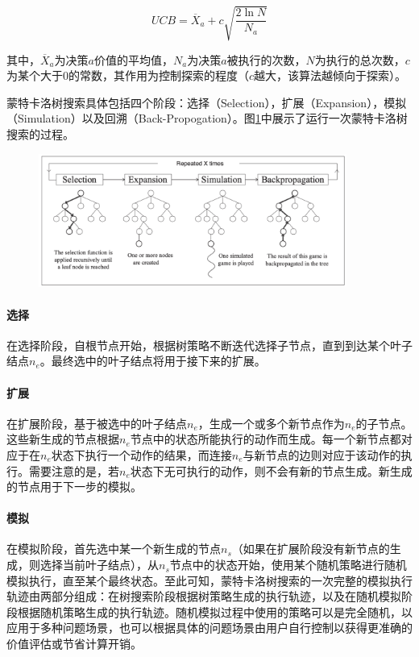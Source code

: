 \begin{equation}
UCB = \overline{X}_{a} + c\sqrt{\frac{2\ln N}{N_a}}
\end{equation}

其中，$\overline{X}_{a}$为决策$a$价值的平均值，$N_a$为决策$a$被执行的次数，$N$为执行的总次数，$c$为某个大于0的常数，其作用为控制探索的程度（$c$越大，该算法越倾向于探索）。

蒙特卡洛树搜索具体包括四个阶段：选择（Selection），扩展（Expansion），模拟（Simulation）以及回溯（Back-Propogation）。图\ref{fig:mcts_process}中展示了运行一次蒙特卡洛树搜索的过程。

\begin{figure}[htb]
\centering
\includegraphics[width=0.9\textwidth]{./figs/mcts_process}
\textbf{}
\label{fig:mcts_process}
\end{figure}

\paragraph{选择}
在选择阶段，自根节点开始，根据树策略不断迭代选择子节点，直到到达某个叶子结点$n_e$。最终选中的叶子结点将用于接下来的扩展。
\paragraph{扩展}
在扩展阶段，基于被选中的叶子结点$n_e$，生成一个或多个新节点作为$n_e$的子节点。这些新生成的节点根据$n_e$节点中的状态所能执行的动作而生成。每一个新节点都对应于在$n_e$状态下执行一个动作的结果，而连接$n_e$与新节点的边则对应于该动作的执行。需要注意的是，若$n_e$状态下无可执行的动作，则不会有新的节点生成。新生成的节点用于下一步的模拟。
\paragraph{模拟}
在模拟阶段，首先选中某一个新生成的节点$n_s$（如果在扩展阶段没有新节点的生成，则选择当前叶子结点），从$n_s$节点中的状态开始，使用某个随机策略进行随机模拟执行，直至某个最终状态。至此可知，蒙特卡洛树搜索的一次完整的模拟执行轨迹由两部分组成：在树搜索阶段根据树策略生成的执行轨迹，以及在随机模拟阶段根据随机策略生成的执行轨迹。随机模拟过程中使用的策略可以是完全随机，以应用于多种问题场景，也可以根据具体的问题场景由用户自行控制以获得更准确的价值评估或节省计算开销。
